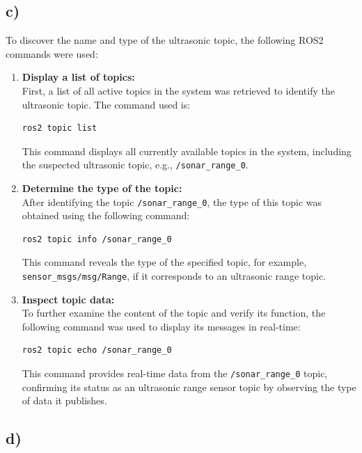 \documentclass[template,12pt,a4paper,enabledeprecatedfontcommands]{template}
\begin{document}
\subsection{c)}

To discover the name and type of the ultrasonic topic, the following ROS2 commands were used:

\begin{enumerate}
    \item \textbf{Display a list of topics:} \\
    First, a list of all active topics in the system was retrieved to identify the ultrasonic topic. The command used is:
    \begin{lstlisting}[language=bash]
    ros2 topic list
    \end{lstlisting}
    This command displays all currently available topics in the system, including the suspected ultrasonic topic, e.g., \texttt{/sonar\_range\_0}.
    
    \item \textbf{Determine the type of the topic:} \\
    After identifying the topic \texttt{/sonar\_range\_0}, the type of this topic was obtained using the following command:
    \begin{lstlisting}[language=bash]
    ros2 topic info /sonar_range_0
    \end{lstlisting}
    This command reveals the type of the specified topic, for example, \texttt{sensor\_msgs/msg/Range}, if it corresponds to an ultrasonic range topic.
    
    \item \textbf{Inspect topic data:} \\
    To further examine the content of the topic and verify its function, the following command was used to display its messages in real-time:
    \begin{lstlisting}[language=bash]
    ros2 topic echo /sonar_range_0
    \end{lstlisting}
    This command provides real-time data from the \texttt{/sonar\_range\_0} topic, confirming its status as an ultrasonic range sensor topic by observing the type of data it publishes.
\end{enumerate}



\subsection{d)}
\end{document}
